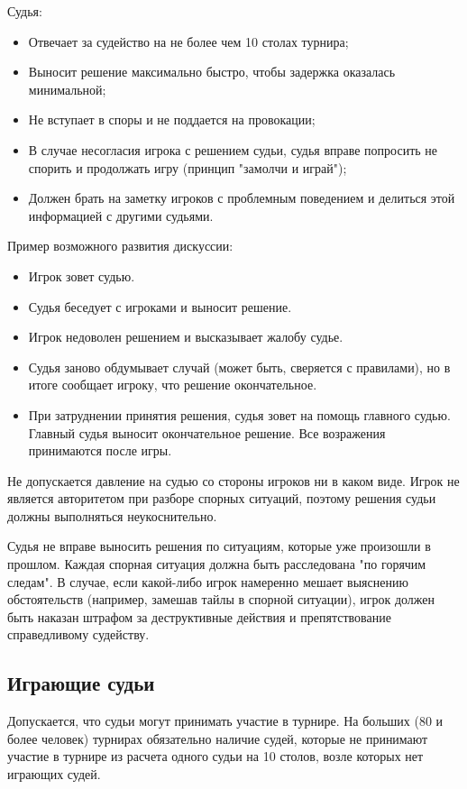 Судья:
\begin{itemize}
	\item Отвечает за судейство на не более чем 10 столах турнира;
	\item Выносит решение максимально быстро, чтобы задержка оказалась минимальной;
	\item Не вступает в споры и не поддается на провокации;
	\item В случае несогласия игрока с решением судьи, судья вправе попросить не спорить и продолжать игру (принцип "замолчи и играй");
	\item Должен брать на заметку игроков с проблемным поведением и делиться этой информацией с другими судьями.
\end{itemize}

Пример возможного развития дискуссии:
\begin{itemize}
	\item Игрок зовет судью.
	\item Судья беседует с игроками и выносит решение.
	\item Игрок недоволен решением и высказывает жалобу судье.
	\item Судья заново обдумывает случай (может быть, сверяется с правилами), но в итоге сообщает игроку, что решение окончательное.
	\item При затруднении принятия решения, судья зовет на помощь главного судью. Главный судья выносит окончательное решение. Все возражения принимаются после игры.
\end{itemize}

Не допускается давление на судью со стороны игроков ни в каком виде. Игрок не является авторитетом при разборе спорных ситуаций, поэтому решения судьи должны выполняться неукоснительно.

Судья не вправе выносить решения по ситуациям, которые уже произошли в прошлом. Каждая спорная ситуация должна быть расследована "по горячим следам". В случае, если какой-либо игрок намеренно мешает выяснению обстоятельств (например, замешав тайлы в спорной ситуации), игрок должен быть наказан штрафом за деструктивные действия и препятствование справедливому судейству.

\subsection{Играющие судьи}

Допускается, что судьи могут принимать участие в турнире. На больших (80 и более человек) турнирах обязательно наличие судей, которые не принимают участие в турнире из расчета одного судьи на 10 столов, возле которых нет играющих судей.


